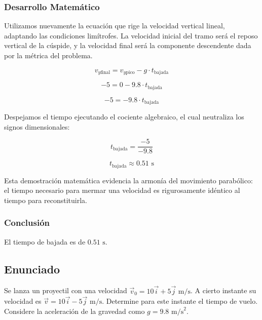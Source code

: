 \documentclass[12pt, a4paper]{article}
\begin{document}
\subsubsection*{Desarrollo Matemático}

Utilizamos nuevamente la ecuación que rige la velocidad vertical lineal, adaptando las condiciones limítrofes. La velocidad inicial del tramo será el reposo vertical de la cúspide, y la velocidad final será la componente descendente dada por la métrica del problema.

$$v_{y\text{final}} = v_{y\text{pico}} - g \cdot t_{\text{bajada}}$$

$$-5 = 0 - 9.8 \cdot t_{\text{bajada}}$$

$$-5 = -9.8 \cdot t_{\text{bajada}}$$

Despejamos el tiempo ejecutando el cociente algebraico, el cual neutraliza los signos dimensionales:

$$t_{\text{bajada}} = \frac{-5}{-9.8}$$

$$t_{\text{bajada}} \approx 0.51 \text{ s}$$

Esta demostración matemática evidencia la armonía del movimiento parabólico: el tiempo necesario para mermar una velocidad es rigurosamente idéntico al tiempo para reconstituirla.

\subsubsection*{Conclusión}

El tiempo de bajada es de $0.51 \text{ s}$.

\newpage

\subsection*{Enunciado}

Se lanza un proyectil con una velocidad $\vec{v}_0 = 10\vec{i} + 5\vec{j} \text{ m/s}$. A cierto instante su velocidad es $\vec{v} = 10\vec{i} - 5\vec{j} \text{ m/s}$. Determine para este instante el tiempo de vuelo. Considere la aceleración de la gravedad como $g = 9.8 \text{ m/s}^2$.

\vspace{0.5cm}

\begin{center}
\end{center}
\end{document}
